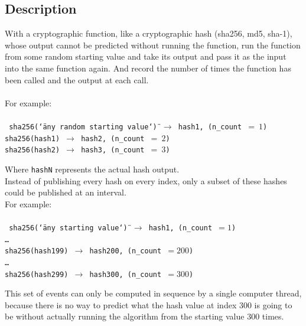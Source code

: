 \documentclass[12pt]{article}
\begin{document}
\subsection{Description}

With a cryptographic function, like a cryptographic hash (sha256, md5,
sha-1), whose output cannot be predicted without running the function,
run the function from some random starting value and take its output
and pass it as the input into the same function again. And record the
number of times the function has been called and the output at each
call. \\\\
\noindent For example: \\\\\noindent
\texttt{
  sha256(\char`\"any random starting value\char`\") $\rightarrow$
  hash1, (n\_count~$=~1$) \\
  sha256(hash1) $\rightarrow$ hash2, (n\_count~$=~2$)\\
  sha256(hash2) $\rightarrow$ hash3, (n\_count~$=~3$)\\
}

\noindent Where \texttt{hashN} represents the actual hash output. \\

Instead of publishing every hash on every index, only a subset of
these hashes could be published at an interval.\\

\noindent For example:\\\\\noindent
\texttt{
 sha256(\char`\"any starting value\char`\") $\rightarrow$ hash1, (n\_count~$=1$)\\
\ldots\\
sha256(hash199) $\rightarrow$ hash200, (n\_count~$=200$)\\
\ldots\\
sha256(hash299) $\rightarrow$ hash300, (n\_count~$=300$)\\
}

This set of events can only be computed in sequence by a single computer thread, because there is no way to predict what the hash value at index $300$ is going to be without actually running the algorithm from the starting value $300$ times.
\end{document}
